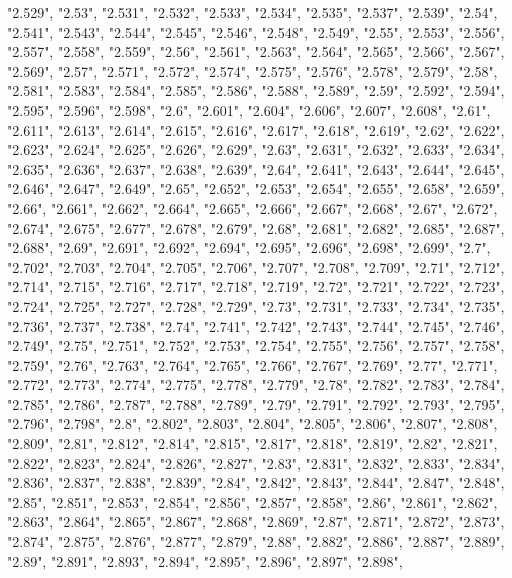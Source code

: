 \documentclass[]{article}
\begin{document}
\begin{itemize}
  "2.529", "2.53", "2.531", "2.532", "2.533", "2.534", "2.535", "2.537",
  "2.539", "2.54", "2.541", "2.543", "2.544", "2.545", "2.546", "2.548",
  "2.549", "2.55", "2.553", "2.556", "2.557", "2.558", "2.559", "2.56",
  "2.561", "2.563", "2.564", "2.565", "2.566", "2.567", "2.569", "2.57",
  "2.571", "2.572", "2.574", "2.575", "2.576", "2.578", "2.579", "2.58",
  "2.581", "2.583", "2.584", "2.585", "2.586", "2.588", "2.589", "2.59",
  "2.592", "2.594", "2.595", "2.596", "2.598", "2.6", "2.601", "2.604",
  "2.606", "2.607", "2.608", "2.61", "2.611", "2.613", "2.614", "2.615",
  "2.616", "2.617", "2.618", "2.619", "2.62", "2.622", "2.623", "2.624",
  "2.625", "2.626", "2.629", "2.63", "2.631", "2.632", "2.633", "2.634",
  "2.635", "2.636", "2.637", "2.638", "2.639", "2.64", "2.641", "2.643",
  "2.644", "2.645", "2.646", "2.647", "2.649", "2.65", "2.652", "2.653",
  "2.654", "2.655", "2.658", "2.659", "2.66", "2.661", "2.662", "2.664",
  "2.665", "2.666", "2.667", "2.668", "2.67", "2.672", "2.674", "2.675",
  "2.677", "2.678", "2.679", "2.68", "2.681", "2.682", "2.685", "2.687",
  "2.688", "2.69", "2.691", "2.692", "2.694", "2.695", "2.696", "2.698",
  "2.699", "2.7", "2.702", "2.703", "2.704", "2.705", "2.706", "2.707",
  "2.708", "2.709", "2.71", "2.712", "2.714", "2.715", "2.716", "2.717",
  "2.718", "2.719", "2.72", "2.721", "2.722", "2.723", "2.724", "2.725",
  "2.727", "2.728", "2.729", "2.73", "2.731", "2.733", "2.734", "2.735",
  "2.736", "2.737", "2.738", "2.74", "2.741", "2.742", "2.743", "2.744",
  "2.745", "2.746", "2.749", "2.75", "2.751", "2.752", "2.753", "2.754",
  "2.755", "2.756", "2.757", "2.758", "2.759", "2.76", "2.763", "2.764",
  "2.765", "2.766", "2.767", "2.769", "2.77", "2.771", "2.772", "2.773",
  "2.774", "2.775", "2.778", "2.779", "2.78", "2.782", "2.783", "2.784",
  "2.785", "2.786", "2.787", "2.788", "2.789", "2.79", "2.791", "2.792",
  "2.793", "2.795", "2.796", "2.798", "2.8", "2.802", "2.803", "2.804",
  "2.805", "2.806", "2.807", "2.808", "2.809", "2.81", "2.812", "2.814",
  "2.815", "2.817", "2.818", "2.819", "2.82", "2.821", "2.822", "2.823",
  "2.824", "2.826", "2.827", "2.83", "2.831", "2.832", "2.833", "2.834",
  "2.836", "2.837", "2.838", "2.839", "2.84", "2.842", "2.843", "2.844",
  "2.847", "2.848", "2.85", "2.851", "2.853", "2.854", "2.856", "2.857",
  "2.858", "2.86", "2.861", "2.862", "2.863", "2.864", "2.865", "2.867",
  "2.868", "2.869", "2.87", "2.871", "2.872", "2.873", "2.874", "2.875",
  "2.876", "2.877", "2.879", "2.88", "2.882", "2.886", "2.887", "2.889",
  "2.89", "2.891", "2.893", "2.894", "2.895", "2.896", "2.897", "2.898",

\end{itemize}
\end{document}
